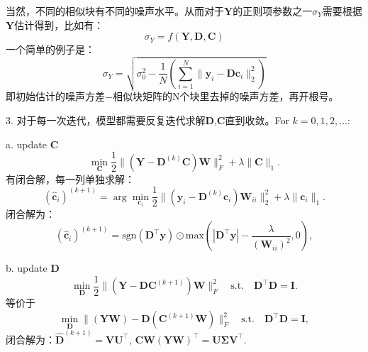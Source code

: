 \documentclass[10pt,twocolumn,letterpaper]{article}
\begin{document}
当然，不同的相似块有不同的噪声水平。从而对于$\mathbf{Y}$的正则项参数之一$\sigma_{Y}$需要根据$\mathbf{Y}$估计得到，比如有：
\begin{equation}
\sigma_{Y} = f(\mathbf{Y},\mathbf{D},\mathbf{C})
\end{equation}
一个简单的例子是：
\begin{equation}
\sigma_{Y} = \sqrt{\sigma_{0}^{2}- \frac{1}{N}(\sum_{i=1}^{N}\|\mathbf{y}_{i}-\mathbf{D}\mathbf{c}_{i}\|_{2}^{2})}
\end{equation}
即初始估计的噪声方差$-$相似块矩阵的N个块里去掉的噪声方差，再开根号。

3. 对于每一次迭代，模型都需要反复迭代求解$\mathbf{D}$,$\mathbf{C}$直到收敛。For $k=0,1,2,...$:

a. update $\mathbf{C}$
\begin{equation}
\min_{\mathbf{C}}\frac{1}{2}\|(\mathbf{Y}-\mathbf{D}^{(k)}\mathbf{C})\mathbf{W}\|_{F}^{2}
+
\lambda\|\mathbf{C}\|_{1}.
\end{equation}
有闭合解，每一列单独求解：
\begin{equation}
(\hat{\mathbf{c}}_{i})^{(k+1)}
=
\arg\min_{\mathbf{c}_{i}}\frac{1}{2}\|(\mathbf{y}_{i}-\mathbf{D}^{(k)}\mathbf{c}_{i})\mathbf{W}_{ii}\|_{2}^{2}
+
\lambda\|\mathbf{c}_{i}\|_{1}.
\end{equation}
闭合解为：
\begin{equation}
(\hat{\mathbf{c}}_{i})^{(k+1)}
=
\text{sgn}(\mathbf{D^{\top}y}) 
\odot 
\text{max}(|\mathbf{D^{\top}y}|-\frac{\lambda}{(\mathbf{W}_{ii})^{2}},0),
\end{equation}

b. update $\mathbf{D}$
\begin{equation}
\min_{\mathbf{D}}\frac{1}{2}\|(\mathbf{Y}-\mathbf{D}\mathbf{C}^{(k+1)})\mathbf{W}\|_{F}^{2}
\quad
\text{s.t.}
\quad
\mathbf{D}^{\top}\mathbf{D} =\mathbf{I}. 
\end{equation}
等价于
\begin{equation}
\min_{\mathbf{D}}\|(\mathbf{Y}\mathbf{W})-\mathbf{D}(\mathbf{C}^{(k+1)}\mathbf{W})\|_{F}^{2}
\quad
\text{s.t.}
\quad
\mathbf{D}^{\top}\mathbf{D} = \mathbf{I},
\end{equation}
闭合解为：$\hat{\mathbf{D}}^{(k+1)}=\mathbf{V}\mathbf{U}^{\top}$, $\mathbf{C}\mathbf{W}(\mathbf{Y}\mathbf{W})^{\top}=\mathbf{U}\mathbf{\Sigma}\mathbf{V}^{\top}$.

{
\small


}
\end{document}
